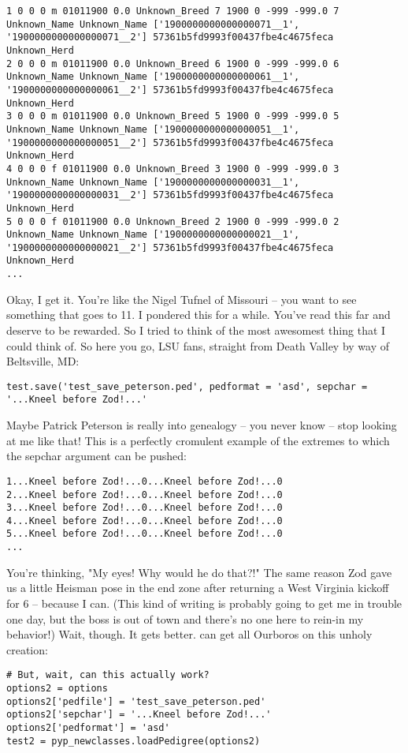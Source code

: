 \begin{verbatim}
1 0 0 0 m 01011900 0.0 Unknown_Breed 7 1900 0 -999 -999.0 7 Unknown_Name Unknown_Name ['1900000000000000071__1', '1900000000000000071__2'] 57361b5fd9993f00437fbe4c4675feca Unknown_Herd
2 0 0 0 m 01011900 0.0 Unknown_Breed 6 1900 0 -999 -999.0 6 Unknown_Name Unknown_Name ['1900000000000000061__1', '1900000000000000061__2'] 57361b5fd9993f00437fbe4c4675feca Unknown_Herd
3 0 0 0 m 01011900 0.0 Unknown_Breed 5 1900 0 -999 -999.0 5 Unknown_Name Unknown_Name ['1900000000000000051__1', '1900000000000000051__2'] 57361b5fd9993f00437fbe4c4675feca Unknown_Herd
4 0 0 0 f 01011900 0.0 Unknown_Breed 3 1900 0 -999 -999.0 3 Unknown_Name Unknown_Name ['1900000000000000031__1', '1900000000000000031__2'] 57361b5fd9993f00437fbe4c4675feca Unknown_Herd
5 0 0 0 f 01011900 0.0 Unknown_Breed 2 1900 0 -999 -999.0 2 Unknown_Name Unknown_Name ['1900000000000000021__1', '1900000000000000021__2'] 57361b5fd9993f00437fbe4c4675feca Unknown_Herd
...
\end{verbatim}
Okay, I get it. You're like the Nigel Tufnel of Missouri -- you want to see something that goes to 11. I pondered this for a while. You've read this far
and deserve to be rewarded. So I tried to think of the most awesomest thing that I could think of. So here you go, LSU fans, straight from Death Valley
by way of Beltsville, MD:
\begin{verbatim}
test.save('test_save_peterson.ped', pedformat = 'asd', sepchar = '...Kneel before Zod!...'
\end{verbatim}
Maybe Patrick Peterson is really into genealogy -- you never know -- stop looking at me like that! This is a perfectly cromulent example of the extremes to
which the sepchar argument can be pushed:
\begin{verbatim}
1...Kneel before Zod!...0...Kneel before Zod!...0
2...Kneel before Zod!...0...Kneel before Zod!...0
3...Kneel before Zod!...0...Kneel before Zod!...0
4...Kneel before Zod!...0...Kneel before Zod!...0
5...Kneel before Zod!...0...Kneel before Zod!...0
...
\end{verbatim}
You're thinking, "My eyes! Why would he do that?!" The same reason Zod gave us a little Heisman pose in the end zone after returning a West Virginia kickoff for 6 --
because I can. (This kind of writing is probably going to get me in trouble one day, but the boss is out of town and there's no one here to rein-in my behavior!) Wait,
though. It gets better. \PyPedal{} can get all Ourboros on this unholy creation:
\begin{verbatim}
# But, wait, can this actually work?
options2 = options
options2['pedfile'] = 'test_save_peterson.ped'
options2['sepchar'] = '...Kneel before Zod!...'
options2['pedformat'] = 'asd'
test2 = pyp_newclasses.loadPedigree(options2)
\end{verbatim}

